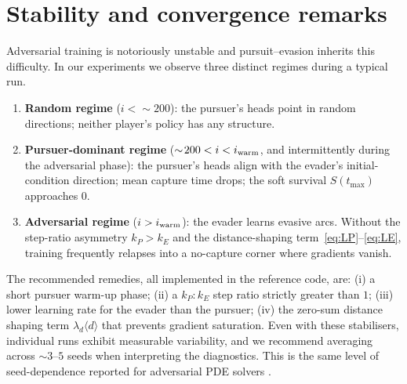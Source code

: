 \documentclass[11pt]{article}
\begin{document}
\section{Stability and convergence remarks}
Adversarial training is notoriously unstable
\citep{mescheder2018gan, daskalakis2018training} and pursuit--evasion
inherits this difficulty.  In our experiments we observe three
distinct regimes during a typical run.
\begin{enumerate}
\item \textbf{Random regime} ($i\!<\!\sim\!200$): the pursuer's heads
      point in random directions; neither player's policy has any
      structure.
\item \textbf{Pursuer-dominant regime} ($\sim\!200 < i < i_{\rm warm}$,
      and intermittently during the adversarial phase):
      the pursuer's heads align with the evader's initial-condition
      direction; mean capture time drops; the soft survival
      $S(t_{\max})$ approaches $0$.
\item \textbf{Adversarial regime} ($i>i_{\rm warm}$): the evader
      learns evasive arcs.  Without the step-ratio asymmetry
      $k_P\!>\!k_E$ and the distance-shaping
      term~\eqref{eq:LP}--\eqref{eq:LE}, training frequently relapses
      into a no-capture corner where gradients vanish.
\end{enumerate}
The recommended remedies, all implemented in the reference code,
are: (i) a short pursuer warm-up phase; (ii) a $k_P\!:\!k_E$ step ratio
strictly greater than $1$; (iii) lower learning rate for the evader
than the pursuer; (iv) the zero-sum distance shaping term
$\lambda_d\langle d\rangle$ that prevents gradient saturation.  Even
with these stabilisers, individual runs exhibit measurable variability,
and we recommend averaging across $\sim 3$--$5$ seeds when interpreting
the diagnostics.  This is the same level of seed-dependence reported
for adversarial PDE solvers
\citep{wang2021understanding}.

\end{document}
